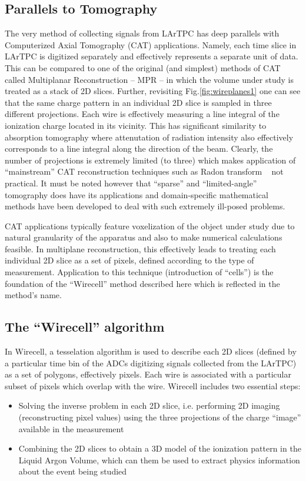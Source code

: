 \documentclass[a4paper]{jpconf}
\begin{document}
\subsection{Parallels to Tomography}
The very method of collecting signals from LArTPC has deep parallels with Computerized Axial Tomography
(CAT) applications. Namely, each time slice in LArTPC is
digitized separately and effectively represents a separate unit of data. This can be compared to one of the original (and simplest) methods of CAT
called Multiplanar Reconstruction -- MPR -- in which the volume under study is treated as a stack of 2D slices. Further, revisiting
Fig.\ref{fig:wireplanes1} one can see that the same charge pattern in an individual 2D slice is sampled in three different projections.
Each wire is effectively measuring a line integral of the ionization charge located in its vicinity. This has significant similarity
to absorption tomography where attenutation of radiation intensity also effectively corresponds to a line integral along
the direction of the beam. Clearly, the number of projections is extremely limited (to three) which makes application of ``mainstream''
CAT reconstruction techniques such as Radon transform ~\cite{radon1}
not practical. It must be noted however that ``sparse'' and ``limited-angle'' tomography
does have its applications and domain-specific mathematical methods have been developed to deal with such extremely ill-posed problems.

CAT applications typically feature voxelization of the object under study due to natural granularity of the apparatus and also to make numerical
calculations feasible. In multiplane reconstruction, this effectively leads to treating each individual 2D slice as a set of pixels, defined according
to the type of measurement. Application to this technique (introduction of ``cells'') is the foundation of the ``Wirecell'' method described here
\cite{wirecell} which is reflected in the method's name.

\subsection{The ``Wirecell'' algorithm}
In Wirecell, a tesselation algorithm is used to describe each 2D slices (defined by a particular time bin of the ADCs digitizing signals
collected from the LArTPC) as a set of polygons, effectively pixels. Each wire is associated with a particular subset of pixels which overlap
with the wire. Wirecell includes two essential steps:
\begin{itemize}
\item Solving the inverse problem in each 2D slice, i.e. performing 2D imaging (reconstructing pixel values) using the three projections of the
charge ``image'' available in the measurement
\item Combining the 2D slices to obtain a 3D model of the ionization pattern in the Liquid Argon Volume, which can them be used to extract
physics information about the event being studied
\end{itemize}
\end{document}
